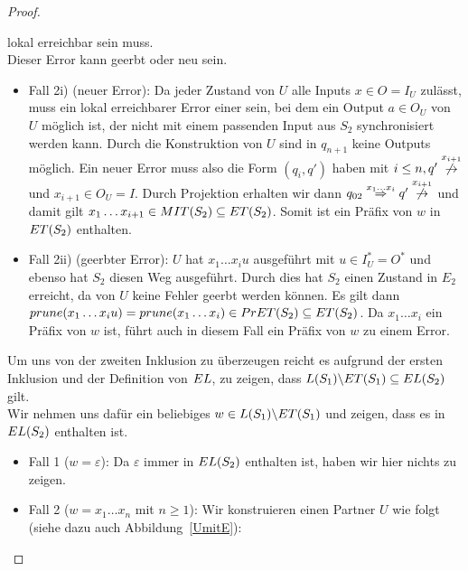 \begin{proof}
\begin{itemize}
      lokal erreichbar sein muss.\\
      Dieser Error kann geerbt oder neu sein.
      \begin{itemize}
        \item Fall 2i) (neuer Error): Da jeder Zustand von $U$ alle Inputs $x\in
          O=I_U$ zulässt, muss ein lokal erreichbarer Error einer sein, bei dem
          ein Output $a\in O_U$ von $U$ möglich ist, der nicht mit einem
          passenden Input aus $S_2$ synchronisiert werden kann. Durch die
          Konstruktion von $U$ sind in $q_{n+1}$ keine Outputs möglich. Ein
          neuer Error muss also die Form $(q_i,q')$ haben mit $i\leq n, q'
          \overset{x_{i+1}}{\not{\hspace{-0.1cm}\rightarrow}}$ und $x_{i+1}\in
          O_U=I$. Durch Projektion erhalten wir dann $q_{02} \overset{x_1\dots
          x_i}{\Rightarrow} q'
          \overset{x_{i+1}}{\not{\hspace{-0.1cm}\rightarrow}}$ und damit gilt
          $x_1\dots x_{i+1}\in MIT{}(S_2)\subseteq ET{}(S_2)$. Somit ist ein Präfix
          von $w$ in $ET{}(S_2)$ enthalten.
        \item Fall 2ii) (geerbter Error): $U$ hat $x_1\dots x_i u$ ausgeführt
          mit $u\in I_U^*=O^*$ und ebenso hat $S_2$ diesen Weg ausgeführt.
          Durch dies hat $S_2$ einen Zustand in $E_2$ erreicht, da von $U$
          keine Fehler geerbt werden können. Es gilt dann $prune{}(x_1\dots
          x_iu)=prune{}(x_1\dots x_i)\in PrET{}(S_2)\subseteq ET{}(S_2)$. Da $x_1\dots
          x_i$ ein Präfix von $w$ ist, führt auch in diesem Fall ein Präfix von
          $w$ zu einem Error.
      \end{itemize}
  \end{itemize}
  Um uns von der zweiten Inklusion zu überzeugen reicht es aufgrund der ersten
  Inklusion und der Definition von $EL{}$, zu zeigen, dass
  $L(S_1)\backslash ET{}(S_1)\subseteq EL{}(S_2)$ gilt.\\
  Wir nehmen uns dafür ein beliebiges $w\in L(S_1)\backslash ET{}(S_1)$ und
  zeigen, dass es in $EL{}(S_2)$ enthalten ist.
  \begin{itemize}
    \item Fall 1 ($w=\varepsilon$): Da $\varepsilon$ immer in $EL{}(S_2)$
      enthalten ist, haben wir hier nichts zu zeigen.
    \item Fall 2 ($w=x_1\dots x_n$ mit $n\geq 1$): Wir konstruieren einen
      Partner $U$ wie folgt (siehe dazu auch Abbildung~\ref{UmitE}):
      \begin{itemize}

\end{itemize}
\end{itemize}
\end{proof}
